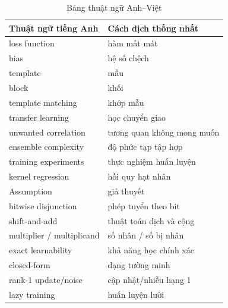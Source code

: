 \begin{table}[ht]
\centering
\caption{Bảng thuật ngữ Anh--Việt}
\label{tab:glossary}
\renewcommand{\arraystretch}{1.2}
\begin{tabular}{|p{}|p{}|}
\hline
	\textbf{Thuật ngữ tiếng Anh} & \textbf{Cách dịch thống nhất} \\
\hline
loss function & hàm mất mát \\
\hline
bias & hệ số chệch \\
\hline
template & mẫu \\
\hline
block & khối \\
\hline
template matching  & khớp mẫu \\
\hline
transfer learning & học chuyển giao \\
\hline
unwanted correlation & tương quan không mong muốn \\
\hline
ensemble complexity & độ phức tạp tập hợp \\
\hline
training experiments & thực nghiệm huấn luyện \\
\hline
kernel regression & hồi quy hạt nhân \\
\hline
Assumption & giả thuyết \\
\hline
bitwise disjunction & phép tuyển theo bit \\
\hline
shift-and-add & thuật toán dịch và cộng \\
\hline
multiplier / multiplicand & số nhân / số bị nhân \\
\hline
exact learnability & khả năng học chính xác \\
\hline
closed-form & dạng tường minh \\
\hline
rank-1 update/noise & cập nhật/nhiễu hạng 1 \\
\hline
lazy training & huấn luyện lười \\
\hline
\end{tabular}
\end{table}

